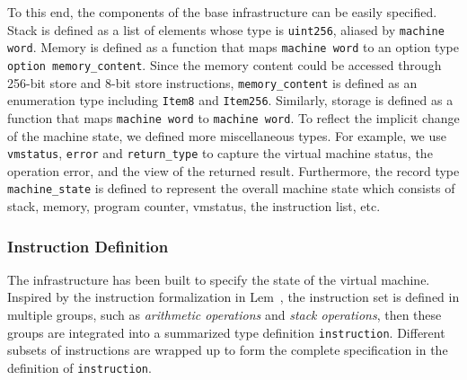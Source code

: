 \documentclass[runningheads]{llncs}
\begin{document}
To this end, the components of the base infrastructure can be easily specified. Stack is defined as a list of elements whose type is \texttt{uint256}, aliased by \texttt{machine word}. Memory is defined as a function that maps \texttt{machine word} to an option type \texttt{option memory\_content}. Since the memory content could be accessed through 256-bit store and 8-bit store instructions, \texttt{memory\_content} is defined as an enumeration type including \texttt{Item8} and \texttt{Item256}. Similarly, storage is defined as a function that maps \texttt{machine word} to \texttt{machine word}. To reflect the implicit change of the machine state, we defined more miscellaneous types. For example, we use \texttt{vmstatus}, \texttt{error} and \texttt{return\_type} to capture the virtual machine status, the operation error, and the view of the returned result. Furthermore, the record type \texttt{machine\_state} is defined to represent the overall machine state which consists of stack, memory, program counter, vmstatus, the instruction list, etc.

\subsubsection{Instruction Definition}\label{sec:instruction}
The infrastructure has been built to specify the state of the virtual machine. %
Inspired by the instruction formalization in Lem~\cite{hirai2017defining}, the instruction set is defined in multiple groups, such as {\em arithmetic operations} and {\em stack operations}, then these groups are integrated into a summarized type definition \texttt{instruction}. %
Different subsets of instructions are wrapped up to form the complete specification in the definition of \texttt{instruction}.
\end{document}
